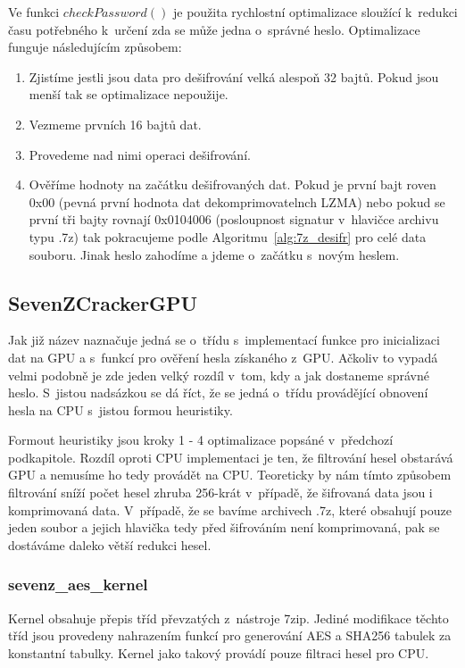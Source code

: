  Ve funkci $checkPassword()$ je použita rychlostní optimalizace sloužící k~redukci času
potřebného k~určení zda se může jedna o~správné heslo. Optimalizace funguje následujícím způsobem:
\begin{enumerate}
    \item Zjistíme jestli jsou data pro dešifrování velká alespoň 32 bajtů. Pokud jsou menší tak
	se optimalizace nepoužije.
    \item Vezmeme prvních 16 bajtů dat.
    \item Provedeme nad nimi operaci dešifrování.
    \item Ověříme hodnoty na začátku dešifrovaných dat. Pokud je první bajt roven 0x00
	(pevná první hodnota dat dekomprimovatelnch LZMA) nebo pokud se první tři bajty rovnají
	0x0104006 (posloupnost signatur v~hlavičce archivu typu .7z) tak pokracujeme podle
	Algoritmu~\ref{alg:7z_desifr} pro celé data souboru. Jinak heslo zahodíme a jdeme
o~začátku s~novým heslem.
\end{enumerate}
\subsection{SevenZCrackerGPU}
Jak již název naznačuje jedná se o~třídu s~implementací funkce pro inicializaci dat na GPU a
s~funkcí pro ověření hesla získaného z~GPU. Ačkoliv to vypadá velmi podobně je zde jeden velký
rozdíl v~tom, kdy a jak dostaneme správné heslo. S~jistou nadsázkou se dá říct, že se jedná
o~třídu provádějící obnovení hesla na CPU s~jistou formou heuristiky. 

Formout heuristiky jsou kroky 1 - 4 optimalizace popsáné v~předchozí podkapitole. Rozdíl oproti
CPU implementaci je ten, že filtrování hesel obstarává GPU a nemusíme ho tedy provádět na CPU.
Teoreticky by nám tímto způsobem filtrování sníží počet hesel zhruba 256-krát v~případě, že
šifrovaná data jsou i komprimovaná data. V~případě, že se bavíme archivech .7z, které obsahují
pouze jeden soubor a jejich hlavička tedy před šifrováním není komprimovaná, pak se dostáváme
daleko větší redukci hesel.

\subsubsection{sevenz\_aes\_kernel}
Kernel obsahuje přepis tříd převzatých z~nástroje 7zip. Jediné modifikace těchto tříd jsou
provedeny nahrazením funkcí pro generování AES a SHA256 tabulek za konstantní tabulky. Kernel jako
takový provádí pouze filtraci hesel pro CPU. 

